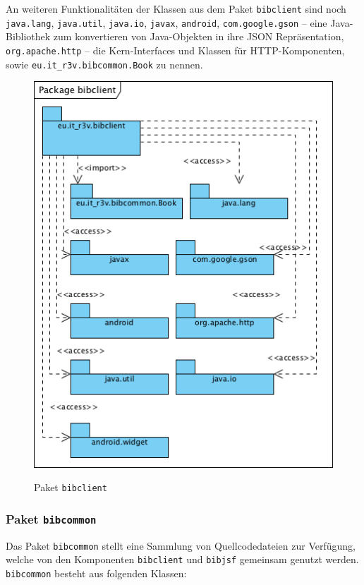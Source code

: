 \documentclass[fontsize=12pt,paper=a4,twoside]{scrartcl}
\begin{document}
\newpage

An weiteren Funktionalitäten der Klassen aus dem Paket \texttt{bibclient} sind noch \texttt{java.lang},
\texttt{java.util}, \texttt{java.io}, \texttt{javax}, \texttt{android}, \texttt{com.google.gson} -- eine Java-Bibliothek zum konvertieren von Java-Objekten in ihre JSON Repräsentation, \texttt{org.apache.http} -- die Kern-Interfaces und Klassen für HTTP-Komponenten, sowie \texttt{eu.it\_r3v.bibcommon.Book} zu nennen.

\begin{figure} [H] 
\caption{Paket \texttt{bibclient}} \centering
	\includegraphics[scale=1.9]{Diagramme/Packagebibclient.png} 
	\label{pic:PackageClient} 
\end{figure}


\subsubsection{Paket \texttt{bibcommon}}
\label{sec:bibcommon}

Das Paket \texttt{bibcommon} stellt eine Sammlung von Quellcodedateien zur Verfügung, welche von den Komponenten \texttt{bibclient} und \texttt{bibjsf} gemeinsam genutzt werden. \texttt{bibcommon} besteht aus folgenden Klassen:
\end{document}
